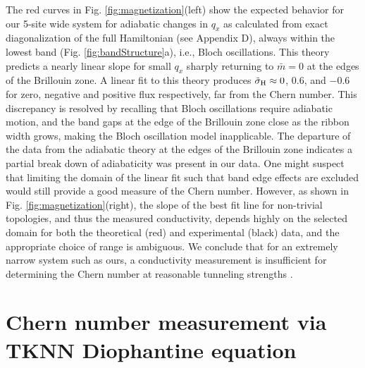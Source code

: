 	The red curves in Fig. \ref{fig:magnetization}(left) show the expected behavior for our 5-site wide system for adiabatic changes in $q_x$ as calculated from exact diagonalization of the full Hamiltonian (see Appendix D), always within the lowest band (Fig. \ref{fig:bandStructure}a), i.e., Bloch oscillations.  This theory predicts a nearly linear slope for small $q_x$ sharply returning to $\bar{m}=0$ at the edges of the Brillouin zone. A linear fit to this theory produces $\tilde{\sigma}_{\rm{H}}\approx0$, $0.6$, and $-0.6$ for zero, negative and positive flux respectively, far from the Chern number. This discrepancy is resolved by recalling that Bloch oscillations require adiabatic motion, and the band gaps at the edge of the Brillouin zone close as the ribbon width grows, making the Bloch oscillation model inapplicable. The departure of the data from the adiabatic theory at the edges of the Brillouin zone indicates a partial break down of adiabaticity was present in our data. One might suspect that limiting the domain of the linear fit such that band edge effects are excluded would still provide a good measure of the Chern number. However, as shown in Fig. \ref{fig:magnetization}(right), the slope of the best fit line for non-trivial topologies, and thus the measured conductivity, depends highly on the selected domain for both the theoretical (red) and experimental (black) data, and the appropriate choice of range is ambiguous. We conclude that for an extremely narrow system such as ours, a conductivity measurement is insufficient for determining the Chern number at reasonable tunneling strengths \cite{Mugel2017}. 
	
\section{Chern number measurement via TKNN Diophantine equation}

